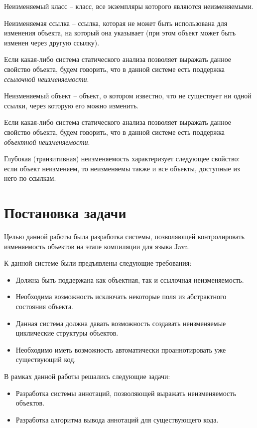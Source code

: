 \begin{Def}\label{immutabule_class}
Неизменяемый класс -- класс, все экземпляры которого являются неизменяемыми. 
\end{Def}

\begin{Def}\label{reference_immutability}
Неизменяемая ссылка -- ссылка, которая не может быть использована для изменения объекта, на который она указывает (при этом объект может быть изменен через другую ссылку).
\end{Def} 

Если какая-либо система статического анализа позволяет выражать данное свойство объекта, будем говорить, что в данной системе есть поддержка \textit{ссылочной неизменяемости}. 

\begin{Def}\label{immutable_object}
Неизменяемый объект -- объект, о котором известно, что не существует ни одной ссылки, через которую его можно изменить.
\end{Def}

Если какая-либо система статического анализа позволяет выражать данное свойство объекта, будем говорить, что в данной системе есть поддержка \textit{объектной неизменяемости}.

\begin{Def}\label{deep_immutablity}
Глубокая (транзитивная) неизменяемость характеризует следующее свойство: если объект неизменяем, то неизменяемы также и все объекты, доступные из него по ссылкам.
\end{Def}



\section{Постановка задачи}

Целью данной работы была разработка системы, позволяющей контролировать изменяемость объектов на этапе компиляции для языка Java. 

К данной системе были предъявлены следующие требования:

\begin{itemize}
	\item Должна быть поддержана как объектная, так и ссылочная неизменяемость.
	
	\item Необходима возможность исключать некоторые поля из абстрактного состояния объекта. 
	
	\item Данная система должна давать возможность создавать неизменяемые циклические структуры объектов.
	
	\item Необходимо иметь возможность автоматически проаннотировать уже существующий код.
\end{itemize}

В рамках данной работы решались следующие задачи:

\begin{itemize}

	\item Разработка системы аннотаций, позволяющей выражать неизменяемость объектов.
	
	\item Разработка алгоритма вывода аннотаций для существующего кода.

\end{itemize}



